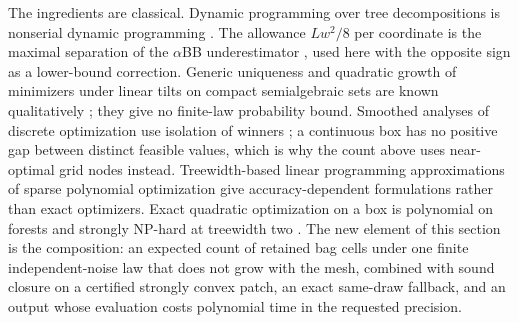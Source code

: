 The ingredients are classical. Dynamic programming over tree decompositions
is nonserial dynamic programming \citep{bertele1972-nonserial-dynamic-programming}. The allowance
$Lw^2/8$ per coordinate is the maximal separation of the
$\alpha$BB underestimator \citep{adjiman1998-a-global-optimization-method-bb}, used here with the
opposite sign as a lower-bound correction. Generic uniqueness and quadratic
growth of minimizers under linear tilts on compact semialgebraic sets are
known qualitatively \citep{lee2017-generic-properties-for-semialgebraic-programs}; they give no finite-law probability
bound. Smoothed analyses of discrete optimization use isolation of winners
\citep{beier2006-typical-properties-of-winners-and,roglin2007-smoothed-analysis-of-integer-programming}; a continuous box has no
positive gap between distinct feasible values, which is why the count above
uses near-optimal grid nodes instead. Treewidth-based linear programming
approximations of sparse polynomial optimization \citep{bienstock2018-lp-formulations-for-polynomial-optimization}
give accuracy-dependent formulations rather than exact optimizers. Exact
quadratic optimization on a box is polynomial on forests and strongly
NP-hard at treewidth two \citep{pia2026-treewidth-and-the-complexity-of}. The new element of
this section is the composition: an expected count of retained bag cells
under one finite independent-noise law that does not grow with the mesh,
combined with sound closure on a certified strongly convex patch, an exact
same-draw fallback, and an output whose evaluation costs polynomial time in
the requested precision.
